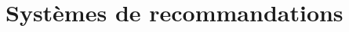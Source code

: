 \documentclass[12pt]{report}
\begin{document}
\renewcommand{\contentsname}{Sommaire}
\tableofcontents
\clearpage

\listoffigures
\clearpage

\listoftables
\clearpage

\listofalgorithmes
\clearpage



% 

% 
% 

% 
% 

% 

\newpage
{} 
% 


\chapter{Systèmes de recommandations}


% 

% 

% 

% 
\newpage
{} 
 

\end{document}
